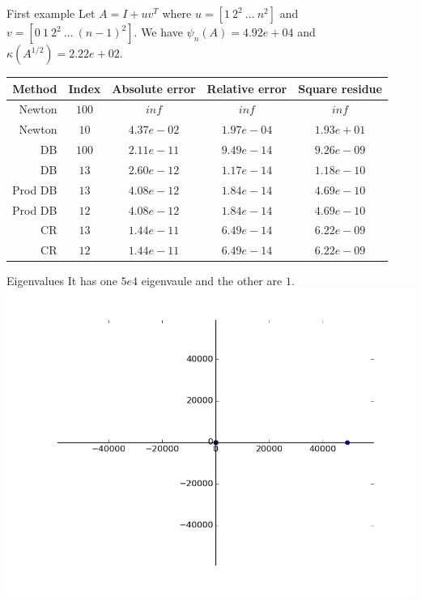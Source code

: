 \documentclass{beamer}
\theoremstyle{plain}
\theoremstyle{definition}
\theoremstyle{remark}
\newcommand{\bra}[1]{\left[#1\right]}
\begin{document}
\begin{frame}{First example}
  Let $A = I + uv^T$ where $u=\bra{ 1\ 2^2\ \dots\ n^2}$ and $v =
  \bra{ 0\ 1\ 2^2\ \dots\ (n-1)^2}$. We have $\psi_n(A) = 4.92e+04$ and
  $\kappa (A^{1/2}) = 2.22e+02$.
  
  \begin{tabular}{r| c c c c}
    Method & Index & Absolute error & Relative error & Square residue \\
    \hline
    Newton & $100$ & $inf$ & $inf$ & $inf$ \\
    Newton & $10$ & $4.37e-02$ & $1.97e-04$ & $1.93e+01$ \\
    \hline
    DB & $100$ & $2.11e-11$ & $9.49e-14$ & $9.26e-09$ \\
    DB & $13$ & $2.60e-12$ & $1.17e-14$ & $1.18e-10$ \\
    \hline
    Prod DB & $13$ & $4.08e-12$ & $1.84e-14$ & $4.69e-10$ \\
    Prod DB & $12$ & $4.08e-12$ & $1.84e-14$ & $4.69e-10$ \\
    \hline
    CR & $13$ & $1.44e-11$ & $6.49e-14$ & $6.22e-09$ \\
    CR & $12$ & $1.44e-11$ & $6.49e-14$ & $6.22e-09$ \\
  \end{tabular}
\end{frame}

\begin{frame}{Eigenvalues}
  It has one $5e4$ eigenvaule and the other are $1$.
  \includegraphics[width=\textwidth,height=\textheight]{"e1/eigs"}
\end{frame}
\end{document}
